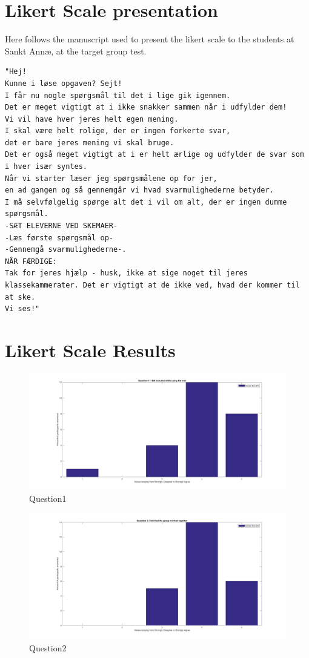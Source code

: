 \section{Likert Scale presentation}\label{sec:likertscalepresent}
Here follows the manuscript used to present the likert scale to the students at Sankt Annæ, at the target group test.

\begin{verbatim}
"Hej!
Kunne i løse opgaven? Sejt!
I får nu nogle spørgsmål til det i lige gik igennem.
Det er meget vigtigt at i ikke snakker sammen når i udfylder dem! 
Vi vil have hver jeres helt egen mening.
I skal være helt rolige, der er ingen forkerte svar,
det er bare jeres mening vi skal bruge. 
Det er også meget vigtigt at i er helt ærlige og udfylder de svar som i hver især syntes. 
Når vi starter læser jeg spørgsmålene op for jer, 
en ad gangen og så gennemgår vi hvad svarmulighederne betyder.
I må selvfølgelig spørge alt det i vil om alt, der er ingen dumme spørgsmål.
-SÆT ELEVERNE VED SKEMAER-
-Læs første spørgsmål op-
-Gennemgå svarmulighederne-.
NÅR FÆRDIGE:
Tak for jeres hjælp - husk, ikke at sige noget til jeres klassekammerater. Det er vigtigt at de ikke ved, hvad der kommer til at ske.
Vi ses!"
\end{verbatim}
\section{Likert Scale Results}\label{sec:testPaper}
    \begin{figure}[H]
		\centering
		\includegraphics[width=0.9\linewidth]{figure/Appendices/Question1} 
		\caption{Question1}
	\end{figure}

    \begin{figure}[H]
		\centering
		\includegraphics[width=0.9\linewidth]{figure/Appendices/Question2} 
		\caption{Question2}
	\end{figure}

